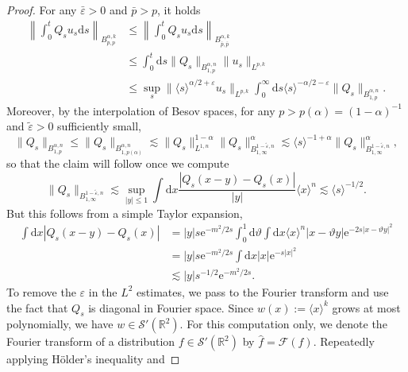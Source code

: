 \documentclass[11pt, a4paper]{scrartcl}
\numberwithin{equation}{section}
\theoremstyle{plain}
\theoremstyle{remark}
\newcommand{\assign}{:=}
\newcommand{\mathd}{\mathrm{d}}
\newcommand{\mathe}{\mathrm{e}}
\begin{document}
\begin{proof}
  For any $\bar{\varepsilon} > 0$ and $\bar{p} > p$, it holds
  \begin{align*}
    \left\| \int_0^t Q_s u_s \mathd s \right\|_{B_{p, p}^{\alpha, k}}
     &\leqslant \left\| \int_0^t Q_s u_s \mathd s \right\|_{B_{\bar{p},
     \bar{p}}^{\alpha, k}} \\
     &\leqslant \int_0^t \mathd s \| Q_s \|_{B_{1,
     p}^{\alpha, n}} \| u_s \|_{L^{p, k}} \\
     &\leqslant \sup_s \| \langle s
     \rangle^{\alpha / 2 + \varepsilon} u_s \|_{L^{p, k}}  \int_0^{\infty}
     \mathd s \langle s \rangle^{- \alpha / 2 - \varepsilon} \| Q_s \|_{B_{1,
     p}^{\alpha, n}} .
  \end{align*}
  Moreover, by the interpolation of Besov spaces, for any $p > p (\alpha) = (1
  - \alpha)^{- 1}$ and $\tilde{\varepsilon} > 0$ sufficiently small,
  \[ \| Q_s \|_{B_{1, p}^{\alpha, n}} \leqslant \| Q_s \|_{B_{1, p
     (\alpha)}^{\alpha, n}} \lesssim \| Q_s \|_{L^{1, n}}^{1 - \alpha} \| Q_s
     \|^{\alpha}_{B_{1, \infty}^{1 - \tilde{\varepsilon}, n}} \lesssim \langle
     s \rangle^{- 1 + \alpha} \| Q_s \|_{B^{1 - \tilde{\varepsilon}, n}_{1,
     \infty}}^{\alpha}, \]
  so that the claim will follow once we compute
  \[ \| Q_s \|_{B^{1 - \tilde{\varepsilon}, n}_{1, \infty}} \lesssim \sup_{| y
     | \leqslant 1}  \int \mathd x \frac{| Q_s (x - y) - Q_s (x) |}{| y |}
     \langle x \rangle^n \lesssim \langle s \rangle^{- 1 / 2} . \]
  But this follows from a simple Taylor expansion,
  \[ \begin{aligned}
       \int \mathd x | Q_s (x - y) - Q_s (x) | &= | y | s \mathe^{- m^2 / 2
       s}  \int_0^1 \mathd \vartheta \int \mathd x \langle x \rangle^n | x -
       \vartheta y | \mathe^{- 2 s | x - \vartheta y |^2}\\
       &= | y | s \mathe^{- m^2 / 2 s}  \int \mathd x | x | \mathe^{- s |
       x |^2}\\
       & \lesssim | y | s^{- 1 / 2} \mathe^{- m^2 / 2 s} .
     \end{aligned} \]
  To remove the $\varepsilon$ in the $L^2$ estimates, we pass to the Fourier
  transform and use the fact that $Q_s$ is diagonal in Fourier space. Since $w
  (x) \assign \langle x \rangle^k$ grows at most polynomially, we have $w \in
  \mathcal{S}' (\mathbb{R}^2)$. For this computation only, we denote the
  Fourier transform of a distribution $f \in \mathcal{S}' (\mathbb{R}^2)$ by
  $\hat{f} = \mathcal{F} (f)$. Repeatedly applying H{\"o}lder's inequality and

\end{proof}
\end{document}
